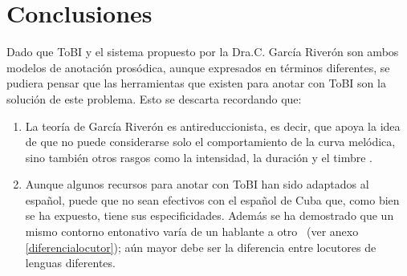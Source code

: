\section{Conclusiones}
Dado que ToBI y el sistema propuesto por la Dra.C. Garc\'ia River\'on son ambos modelos de anotaci\'on pros\'odica, aunque expresados en t\'erminos diferentes, se pudiera pensar que las herramientas que existen para anotar con ToBI son la soluci\'on de este problema. Esto se descarta recordando que:

\begin{enumerate}
\item La teor\'ia de Garc\'ia River\'on es antireduccionista, es decir, que apoya la idea de que no puede considerarse solo el comportamiento de la curva mel\'odica, sino tambi\'en otros rasgos como la intensidad, la duraci\'on y el timbre \cite{menendez2008estudio}.
\item Aunque algunos recursos para anotar con ToBI han sido adaptados al espa\~nol, puede que no sean efectivos con el espa\~nol de Cuba que, como bien se ha expuesto, tiene sus especificidades. Adem\'as se ha demostrado que un mismo contorno entonativo var\'ia de un hablante a otro ~(ver anexo \ref{diferencialocutor}); a\'un mayor debe ser la diferencia entre locutores de lenguas diferentes.
\end{enumerate}
